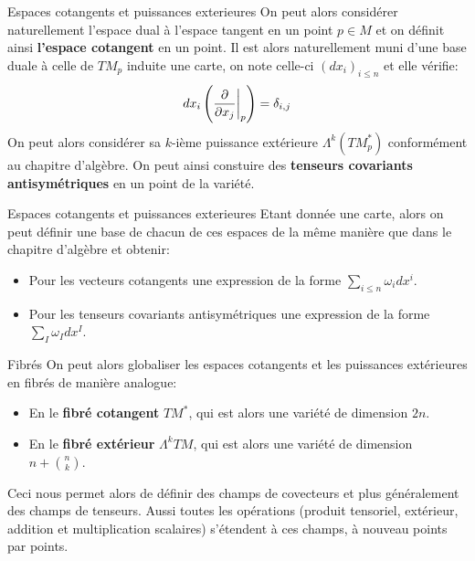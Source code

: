 \documentclass{beamer}
\begin{document}
        \begin{frame}{Espaces cotangents et puissances exterieures}
            On peut alors considérer naturellement l'espace dual à l'espace tangent en un point \( p \in M \) et on définit ainsi \textbf{l'espace cotangent} en un point. Il est alors naturellement muni d'une base duale à celle de $TM_p$ induite une carte, on note celle-ci $(dx_i)_{i \leq n}$ et elle vérifie:
            \[ 
                dx_i\left(\frac{\partial }{\partial x_j}\biggr|_p\right) = \delta_{i, j}
            \]
            On peut alors considérer sa \( k \)-ième puissance extérieure \( \Lambda^k(TM_p^*) \) conformément au chapitre d'algèbre. On peut ainsi constuire des \textbf{tenseurs covariants antisymétriques} en un point de la variété.
        \end{frame} 
        \begin{frame}{Espaces cotangents et puissances exterieures}
            Etant donnée une carte, alors on peut définir une base de chacun de ces espaces de la même manière que dans le chapitre d'algèbre et obtenir:
            \begin{itemize}
               \item Pour les vecteurs cotangents une expression de la forme \( \sum_{i \leq n} \omega_idx^i \).
               \item Pour les tenseurs covariants antisymétriques une expression de la forme \( \sum_{I} \omega_Idx^I \).
            \end{itemize}
        \end{frame} 
        \begin{frame}{Fibrés}
            On peut alors globaliser les espaces cotangents et les puissances extérieures en fibrés de manière analogue:      
            \begin{itemize}
                \item En le \textbf{fibré cotangent} $TM^*$, qui est alors une variété de dimension $2n$.
                \item En le \textbf{fibré extérieur} $\Lambda^kTM$, qui est alors une variété de dimension $n + \binom{n}{k}$.
            \end{itemize}
            Ceci nous permet alors de définir des champs de covecteurs et plus généralement des champs de tenseurs. Aussi toutes les opérations (produit tensoriel, extérieur, addition et multiplication scalaires) s'étendent à ces champs, à nouveau points par points.
        \end{frame}   
\end{document}
